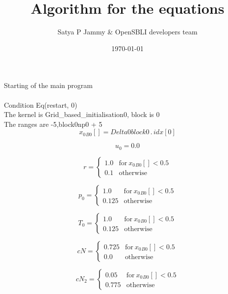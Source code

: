 \documentclass{article}
\title{Algorithm for the equations}
\author{Satya P Jammy \& OpenSBLI developers team}
\date{\today}
\begin{document}
\maketitle
\noindent Starting of the main program\\
\\\noindent Condition Eq(restart, 0)\\\noindent The kernel is Grid_based_initialisation0, block is 0\\\noindent The ranges are -5,block0np0 + 5\\\begin{dmath}{x_{0}{_{B0}}}[{}] = Delta0block0 \,.\, {idx}[{0}]\end{dmath}

\begin{dmath}u_{0} = 0.0\end{dmath}

\begin{dmath}r = \begin{cases} 1.0 & \text{for}\: {x_{0}{_{B0}}}[{}] < 0.5 \\0.1 & \text{otherwise} \end{cases}\end{dmath}

\begin{dmath}p_{0} = \begin{cases} 1.0 & \text{for}\: {x_{0}{_{B0}}}[{}] < 0.5 \\0.125 & \text{otherwise} \end{cases}\end{dmath}

\begin{dmath}T_{0} = \begin{cases} 1.0 & \text{for}\: {x_{0}{_{B0}}}[{}] < 0.5 \\0.125 & \text{otherwise} \end{cases}\end{dmath}

\begin{dmath}cN = \begin{cases} 0.725 & \text{for}\: {x_{0}{_{B0}}}[{}] < 0.5 \\0.0 & \text{otherwise} \end{cases}\end{dmath}

\begin{dmath}cN_{2} = \begin{cases} 0.05 & \text{for}\: {x_{0}{_{B0}}}[{}] < 0.5 \\0.775 & \text{otherwise} \end{cases}\end{dmath}
\end{document}

